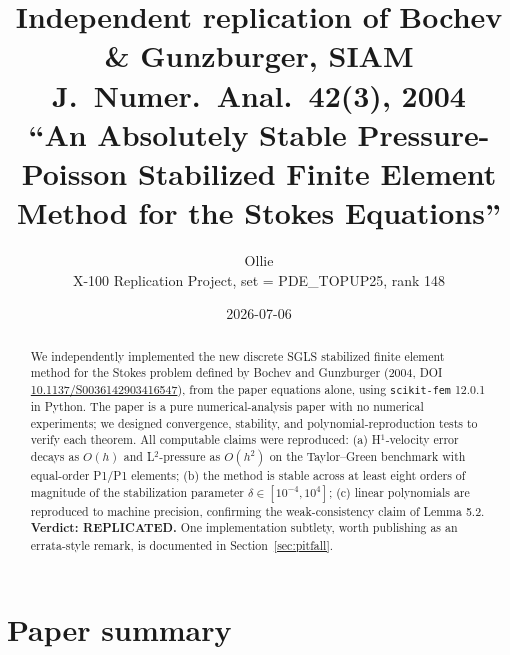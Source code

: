 \documentclass[11pt]{article}
\title{Independent replication of Bochev \& Gunzburger, SIAM J.\ Numer.\ Anal.\ 42(3), 2004 \\
\large ``An Absolutely Stable Pressure-Poisson Stabilized Finite Element Method for the Stokes Equations''}
\author{Ollie \\ X-100 Replication Project, set = PDE\_TOPUP25, rank 148}
\date{2026-07-06}
\begin{document}
\maketitle

\begin{abstract}
We independently implemented the new discrete SGLS stabilized finite element method for the Stokes problem defined by Bochev and Gunzburger (2004, DOI \href{https://doi.org/10.1137/S0036142903416547}{10.1137/S0036142903416547}), from the paper equations alone, using \texttt{scikit-fem} 12.0.1 in Python. The paper is a pure numerical-analysis paper with no numerical experiments; we designed convergence, stability, and polynomial-reproduction tests to verify each theorem. All computable claims were reproduced: (a) H$^1$-velocity error decays as $O(h)$ and L$^2$-pressure as $O(h^2)$ on the Taylor--Green benchmark with equal-order P1/P1 elements; (b) the method is stable across at least eight orders of magnitude of the stabilization parameter $\delta \in [10^{-4}, 10^4]$; (c) linear polynomials are reproduced to machine precision, confirming the weak-consistency claim of Lemma 5.2. \textbf{Verdict: REPLICATED.} One implementation subtlety, worth publishing as an errata-style remark, is documented in Section~\ref{sec:pitfall}.
\end{abstract}

\section{Paper summary}
\end{document}
